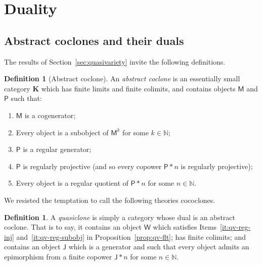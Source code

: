 \documentclass[11pt, a4paper, twoside,leqno]{amsart}
\newcommand{\cat}[1]{\mathbf{#1}}
\numberwithin{equation}{section}
\theoremstyle{plain}
\theoremstyle{definition}
\newtheorem{Defn}[Thm]{Definition}
\begin{document}
\section{Duality}
\label{sec:duality}

\subsection{Abstract coclones and their duals}
\label{sec:ARClo-QClo}

The results of Section~\ref{sec:quasivariety} invite the following
definitions.

\begin{Defn}[Abstract coclone]
  \label{def:arc}
  An \emph{abstract coclone} is an essentially small category
  \(\cat{K}\) which has
  finite limits and finite colimits, and contains objects
  \(\mathsf{M}\) and \(\mathsf{P}\) such that: 
  \begin{enumerate}[label=(\alph*), ref=(\alph*)]
  \item
    \label{it:arc-cogen}
    \(\mathsf{M}\) is a cogenerator;

    \item
    \label{it:arc-sub-J}
    Every object is a subobject of \(\mathsf{M}^{k}\) for some \(k \in
    \mathbb{N}\);
    
  \item
    \label{it:arc-reg-gen}
    \(\mathsf{P}\) is a regular generator;
    
  \item 
    \label{it:arc-reg-proj}
    \(\mathsf{P}\) is regularly projective (and so every copower \(\mathsf{P}\ast n\) is
    regularly projective);

  \item
    \label{it:arc-reg-quot}
    Every object is a regular quotient of \(\mathsf{P}\ast n\) for some
    \(n \in \mathbb{N}\).  
  \end{enumerate}
\end{Defn}

We resisted the temptation to call the following theories cococlones.
\begin{Defn}
  \label{def:quasiclone}
  A \emph{quasiclone} is simply a category whose dual is an abstract
  coclone. That is to say, it contains an object \(\mathsf{W}\) which
  satisfies Items~\ref{it:qv-reg-inj}
  and~\ref{it:qv-reg-subobj} in Proposition~\ref{prop:qv-flt}; has
  finite colimits; and contains an object \(\mathsf{J}\) which is a
  generator and such that
  every object admits an epimorphism from a finite copower
  \(\mathsf{J}\ast n\) for some \(n\in \mathbb{N}
  \).
\end{Defn}
\end{document}
